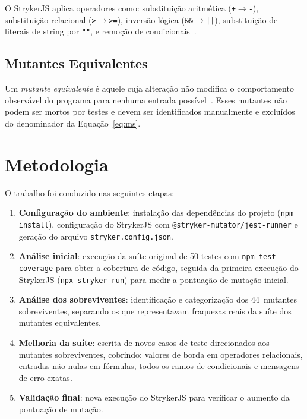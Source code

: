 \documentclass[conference]{IEEEtran}
\begin{document}
O StrykerJS aplica operadores como: substituição aritmética
(\texttt{+}$\to$\texttt{-}), substituição relacional (\texttt{>}$\to$\texttt{>=}),
inversão lógica (\texttt{\&\&}$\to$\texttt{||}), substituição de literais de
string por \texttt{""}, e remoção de condicionais~\cite{stryker}.

\subsection{Mutantes Equivalentes}

Um \textit{mutante equivalente} é aquele cuja alteração não modifica o
comportamento observável do programa para nenhuma entrada
possível~\cite{offutt2001mutation}. Esses mutantes não podem ser mortos por
testes e devem ser identificados manualmente e excluídos do denominador da
Equação~\ref{eq:ms}.

\section{Metodologia}

O trabalho foi conduzido nas seguintes etapas:

\begin{enumerate}
  \item \textbf{Configuração do ambiente}: instalação das dependências do projeto
        (\texttt{npm install}), configuração do StrykerJS com
        \texttt{@stryker-mutator/jest-runner} e geração do arquivo
        \texttt{stryker.config.json}.

  \item \textbf{Análise inicial}: execução da suíte original de 50 testes com
        \texttt{npm test -{}-coverage} para obter a cobertura de código, seguida
        da primeira execução do StrykerJS (\texttt{npx stryker run}) para medir
        a pontuação de mutação inicial.

  \item \textbf{Análise dos sobreviventes}: identificação e categorização dos
        44~mutantes sobreviventes, separando os que representavam fraquezas
        reais da suíte dos mutantes equivalentes.

  \item \textbf{Melhoria da suíte}: escrita de novos casos de teste direcionados
        aos mutantes sobreviventes, cobrindo: valores de borda em operadores
        relacionais, entradas não-nulas em fórmulas, todos os ramos de condicionais
        e mensagens de erro exatas.

  \item \textbf{Validação final}: nova execução do StrykerJS para verificar o
        aumento da pontuação de mutação.
\end{enumerate}
\end{document}
